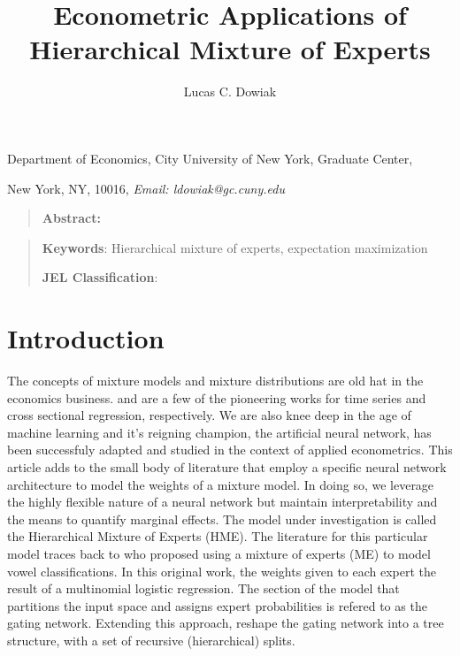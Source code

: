 \documentclass[12pt]{article}
\title{Econometric Applications of Hierarchical Mixture of Experts}
\author{Lucas C. Dowiak}
\begin{document}
 
\maketitle{}


Department of Economics, City University of New York\smallskip, Graduate
Center,

New York, NY, 10016, \textit{Email: ldowiak@gc.cuny.edu}

\qquad

\begin{quotation}
\textbf{Abstract:}
\end{quotation}

\vspace{1pt}

\begin{quotation}
\textbf{Keywords}: Hierarchical mixture of experts, expectation maximization

\textbf{JEL Classification}: 
\end{quotation}

\vspace{1pt}

\section{Introduction}

The concepts of mixture models and mixture distributions are old hat
in the economics business. \cite{Hamilton1989} and \cite{GoldfeldQuant1973}
are a few of the pioneering works for time series and cross sectional
regression, respectively. We are also knee deep in the age of machine
learning and it's reigning champion, the artificial neural network, has
been successfuly adapted and studied in the context of applied econometrics.
This article adds to the small body of literature that employ a specific
neural network architecture to model the weights of a mixture model. In doing
so, we leverage the highly flexible nature of a neural network but maintain
interpretability and the means to quantify marginal effects.
The model under investigation is called the Hierarchical Mixture
of Experts (HME). The literature for this particular model traces back to
\cite{JJNH1991} who proposed using a mixture of experts (ME) to model vowel
classifications. In this original work, the weights given to each expert the
result of a multinomial logistic regression. The section of the model that
partitions the input space and assigns expert probabilities is refered to as
the gating network. Extending this approach, \cite{JordanJacobs1993} reshape
the gating network into a tree structure, with a set of recursive
(hierarchical) splits.
\end{document}
